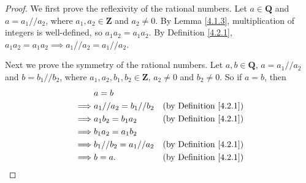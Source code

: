 \begin{proof}
We first prove the reflexivity of the rational numbers.
Let \(a \in \mathbf{Q}\) and \(a = a_1 // a_2\), where \(a_1, a_2 \in \mathbf{Z}\) and \(a_2 \neq 0\).
By Lemma \ref{4.1.3}, multiplication of integers is well-defined, so \(a_1a_2 = a_1a_2\).
By Definition \ref{4.2.1}, \(a_1a_2 = a_1a_2 \implies a_1 // a_2 = a_1 // a_2\).

Next we prove the symmetry of the rational numbers.
Let \(a, b \in \mathbf{Q}\), \(a = a_1 // a_2\) and \(b = b_1 // b_2\), where \(a_1, a_2, b_1, b_2 \in \mathbf{Z}\), \(a_2 \neq 0\) and \(b_2 \neq 0\).
So if \(a = b\), then
\begin{align*}
& a = b \\
\implies & a_1 // a_2 = b_1 // b_2 & \text{(by Definition \ref{4.2.1})} \\
\implies & a_1b_2 = b_1a_2 & \text{(by Definition \ref{4.2.1})} \\
\implies & b_1a_2 = a_1b_2 \\
\implies & b_1 // b_2 = a_1 // a_2 & \text{(by Definition \ref{4.2.1})} \\
\implies & b = a. & \text{(by Definition \ref{4.2.1})}
\end{align*}


\end{proof}
